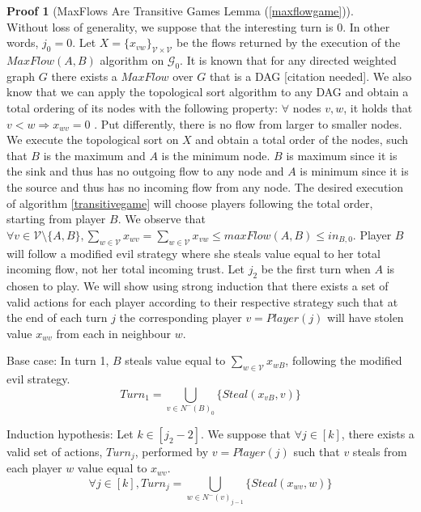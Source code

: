 \documentclass[11pt]{llncs}
\theoremstyle{definition}
\newtheorem{sepproof}{Proof}
\begin{document}
    \begin{sepproof}[MaxFlows Are Transitive Games Lemma (\ref{maxflowgame})] \ \\
    \label{maxflowgameproof}
       Without loss of generality, we suppose that the interesting turn is 0. In other words, $j_0 = 0$. Let $X =
       \{x_{vw}\}_{\mathcal{V} \times \mathcal{V}}$ be the flows returned by the execution of the $MaxFlow\left(A, B\right)$
       algorithm on $\mathcal{G}_0$. It is known that for any directed weighted graph $G$ there exists a $MaxFlow$ over $G$
       that is a DAG [citation needed]. We also know that we can apply the topological sort algorithm to any DAG and obtain a
       total ordering of its nodes with the following property: $\forall$ nodes $v, w$, it holds that
       $v < w \Rightarrow x_{wv} = 0$ \cite{toposort}. Put differently, there is no flow from larger to smaller nodes. We
       execute the topological sort on $X$ and obtain a total order of the nodes, such that $B$ is the maximum and
       $A$ is the minimum node. $B$ is maximum since it is the sink and thus has no outgoing flow to any node and $A$ is
       minimum since it is the source and thus has no incoming flow from any node. The desired execution of algorithm
       \ref{transitivegame} will choose players following the total order, starting from player $B$. We observe that
       $\forall v \in \mathcal{V} \setminus \{A, B\}, \sum\limits_{w \in \mathcal{V}}x_{wv} = \sum\limits_{w \in
       \mathcal{V}}x_{vw} \leq maxFlow\left(A, B\right) \leq in_{B, 0}$. Player $B$ will follow a modified evil strategy
       where she steals value equal to her total incoming flow, not her total incoming trust. Let $j_2$ be the first turn
       when $A$ is chosen to play. We will show using strong induction that there exists a set of valid actions for each
       player according to their respective strategy such that at the end of each turn $j$ the corresponding player $v =
       Player\left(j\right)$ will have stolen value $x_{wv}$ from each in neighbour $w$.

       Base case: In turn 1, $B$ steals value equal to $\sum\limits_{w \in \mathcal{V}}x_{wB}$, following the modified evil
       strategy.
       \begin{equation}
          Turn_1 = \bigcup\limits_{v \in N^{-}\left(B\right)_0}\{Steal\left(x_{vB}, v\right)\}
       \end{equation}

       Induction hypothesis: Let $k \in [j_2 - 2]$. We suppose that $\forall j \in [k]$, there exists a valid set of actions,
       $Turn_j$, performed by $v = Player\left(j\right)$ such that $v$ steals from each player $w$ value equal to $x_{wv}$.
       \begin{equation}
          \forall j \in [k], Turn_j = \bigcup\limits_{w \in N^{-}\left(v\right)_{j-1}}\{Steal\left(x_{wv}, w\right)\}
       \end{equation}


\end{sepproof}
\end{document}
